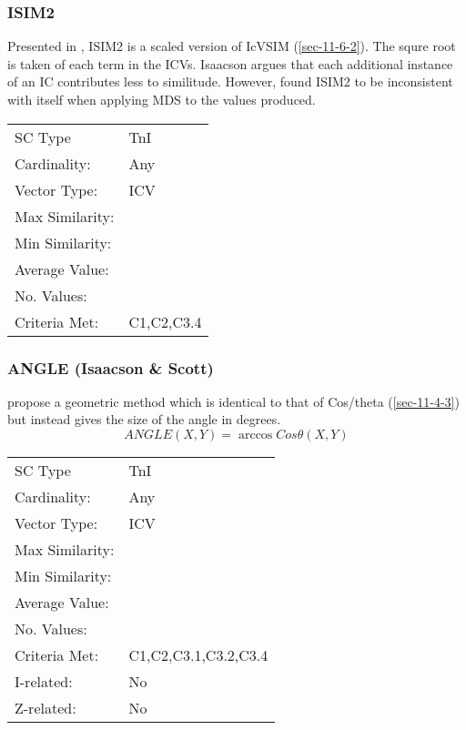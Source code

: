 \documentclass{article}
\begin{document}
\subsubsection{ISIM2}
\label{sec-11-6-3}

Presented in \citet{Isaacson1996}, ISIM2 is a scaled version of IcVSIM
(\ref{sec-11-6-2}). The squre root is taken of each term in the ICVs. Isaacson
argues that each additional instance of an IC contributes less to
similitude. However, \citet{Samplaski2005a} found ISIM2 to be
inconsistent with itself when applying MDS to the values produced.

\begin{center}
\begin{tabular}{ll}
 SC Type          &  TnI         \\
 Cardinality:     &  Any         \\
 Vector Type:     &  ICV         \\
 Max Similarity:  &              \\
 Min Similarity:  &              \\
 Average Value:   &              \\
 No. Values:      &              \\
 Criteria Met:    &  C1,C2,C3.4  \\
\end{tabular}
\end{center}
\subsubsection{ANGLE (Isaacson \& Scott)}
\label{sec-11-6-4}

\citet{Scott1998} propose a geometric method which is identical to
that of Cos/theta (\ref{sec-11-4-3}) but instead gives the size of the
angle in degrees. $$ANGLE(X,Y) = \arccos{Cos\theta(X,Y)}$$

\begin{center}
\begin{tabular}{ll}
 SC Type          &  TnI                   \\
 Cardinality:     &  Any                   \\
 Vector Type:     &  ICV                   \\
 Max Similarity:  &                        \\
 Min Similarity:  &                        \\
 Average Value:   &                        \\
 No. Values:      &                        \\
 Criteria Met:    &  C1,C2,C3.1,C3.2,C3.4  \\
 I-related:       &  No                    \\
 Z-related:       &  No                    \\
\end{tabular}
\end{center}
\end{document}
